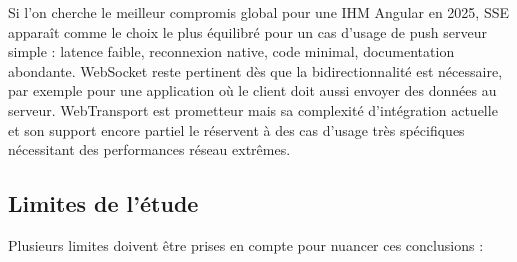 Si l'on cherche le meilleur compromis global pour une IHM Angular en 2025, SSE apparaît comme le choix le plus équilibré pour un cas d'usage de push serveur simple : latence faible, reconnexion native, code minimal, documentation abondante. WebSocket reste pertinent dès que la bidirectionnalité est nécessaire, par exemple pour une application où le client doit aussi envoyer des données au serveur. WebTransport est prometteur mais sa complexité d'intégration actuelle et son support encore partiel le réservent à des cas d'usage très spécifiques nécessitant des performances réseau extrêmes.

\subsection{Limites de l'étude}

Plusieurs limites doivent être prises en compte pour nuancer ces conclusions :

